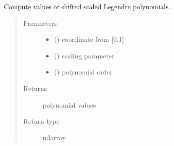 \documentclass[letterpaper,10pt,english]{sphinxmanual}
\begin{document}
\begin{fulllineitems}
\label{\detokenize{petgem/hvfem:petgem.hvfem.PolyLegendre}}
Compute values of shifted scaled Legendre polynomials.
\begin{quote}\begin{description}
\item[{Parameters}] \leavevmode\begin{itemize}
\item {} 
 () \textendash{} coordinate from {[}0,1{]}

\item {} 
 () \textendash{} scaling parameter

\item {} 
 () \textendash{} polynomial order

\end{itemize}

\item[{Returns}] \leavevmode
polynomial values

\item[{Return type}] \leavevmode
ndarray

\end{description}\end{quote}

\end{fulllineitems}

\end{document}
